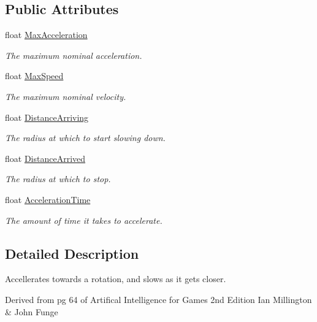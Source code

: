 \subsection*{Public Attributes}
\begin{DoxyCompactItemize}
\item 
float \hyperlink{class_skyrates_1_1_common_1_1_a_i_1_1_lock_at_a9910cc8832b49ccb54957981785470be}{Max\-Acceleration}
\begin{DoxyCompactList}\small\item\em The maximum nominal acceleration. \end{DoxyCompactList}\item 
float \hyperlink{class_skyrates_1_1_common_1_1_a_i_1_1_lock_at_a625348f8b34e9103f2cd7a4de0a4d6b3}{Max\-Speed}
\begin{DoxyCompactList}\small\item\em The maximum nominal velocity. \end{DoxyCompactList}\item 
float \hyperlink{class_skyrates_1_1_common_1_1_a_i_1_1_lock_at_aa2598242366a394957fab66e2231a204}{Distance\-Arriving}
\begin{DoxyCompactList}\small\item\em The radius at which to start slowing down. \end{DoxyCompactList}\item 
float \hyperlink{class_skyrates_1_1_common_1_1_a_i_1_1_lock_at_a8070453746e68b006a34fc2d31f20141}{Distance\-Arrived}
\begin{DoxyCompactList}\small\item\em The radius at which to stop. \end{DoxyCompactList}\item 
float \hyperlink{class_skyrates_1_1_common_1_1_a_i_1_1_lock_at_a84bc49177ac0a08e7209e17e434b39c8}{Acceleration\-Time}
\begin{DoxyCompactList}\small\item\em The amount of time it takes to accelerate. \end{DoxyCompactList}\end{DoxyCompactItemize}


\subsection{Detailed Description}
Accellerates towards a rotation, and slows as it gets closer. 

Derived from pg 64 of Artifical Intelligence for Games 2nd Edition Ian Millington \& John Funge 

